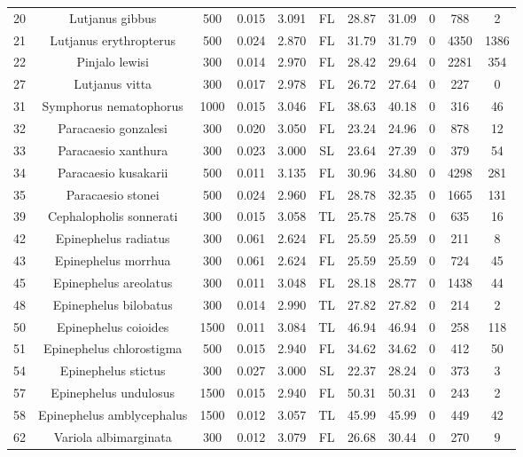 \documentclass{report}\usepackage[]{graphicx}\usepackage[]{color}
\begin{document}
\begin{table}[ht]
{\begin{tabular}{ccccccccccc}
  20 & Lutjanus gibbus & 500 & 0.015 & 3.091 & FL & 28.87 & 31.09 & 0 & 788 & 2 \\ 
  21 & Lutjanus erythropterus & 500 & 0.024 & 2.870 & FL & 31.79 & 31.79 & 0 & 4350 & 1386 \\ 
  22 & Pinjalo lewisi & 300 & 0.014 & 2.970 & FL & 28.42 & 29.64 & 0 & 2281 & 354 \\ 
  27 & Lutjanus vitta & 300 & 0.017 & 2.978 & FL & 26.72 & 27.64 & 0 & 227 & 0 \\ 
  31 & Symphorus nematophorus & 1000 & 0.015 & 3.046 & FL & 38.63 & 40.18 & 0 & 316 & 46 \\ 
  32 & Paracaesio gonzalesi & 300 & 0.020 & 3.050 & FL & 23.24 & 24.96 & 0 & 878 & 12 \\ 
  33 & Paracaesio xanthura & 300 & 0.023 & 3.000 & SL & 23.64 & 27.39 & 0 & 379 & 54 \\ 
  34 & Paracaesio kusakarii & 500 & 0.011 & 3.135 & FL & 30.96 & 34.80 & 0 & 4298 & 281 \\ 
  35 & Paracaesio stonei & 500 & 0.024 & 2.960 & FL & 28.78 & 32.35 & 0 & 1665 & 131 \\ 
  39 & Cephalopholis sonnerati & 300 & 0.015 & 3.058 & TL & 25.78 & 25.78 & 0 & 635 & 16 \\ 
  42 & Epinephelus radiatus & 300 & 0.061 & 2.624 & FL & 25.59 & 25.59 & 0 & 211 & 8 \\ 
  43 & Epinephelus morrhua & 300 & 0.061 & 2.624 & FL & 25.59 & 25.59 & 0 & 724 & 45 \\ 
  45 & Epinephelus areolatus & 300 & 0.011 & 3.048 & FL & 28.18 & 28.77 & 0 & 1438 & 44 \\ 
  48 & Epinephelus bilobatus & 300 & 0.014 & 2.990 & TL & 27.82 & 27.82 & 0 & 214 & 2 \\ 
  50 & Epinephelus coioides & 1500 & 0.011 & 3.084 & TL & 46.94 & 46.94 & 0 & 258 & 118 \\ 
  51 & Epinephelus chlorostigma & 500 & 0.015 & 2.940 & FL & 34.62 & 34.62 & 0 & 412 & 50 \\ 
  54 & Epinephelus stictus & 300 & 0.027 & 3.000 & SL & 22.37 & 28.24 & 0 & 373 & 3 \\ 
  57 & Epinephelus undulosus & 1500 & 0.015 & 2.940 & FL & 50.31 & 50.31 & 0 & 243 & 2 \\ 
  58 & Epinephelus amblycephalus & 1500 & 0.012 & 3.057 & TL & 45.99 & 45.99 & 0 & 449 & 42 \\ 
  62 & Variola albimarginata & 300 & 0.012 & 3.079 & FL & 26.68 & 30.44 & 0 & 270 & 9 \\ 

\end{tabular}}
\end{table}
\end{document}
